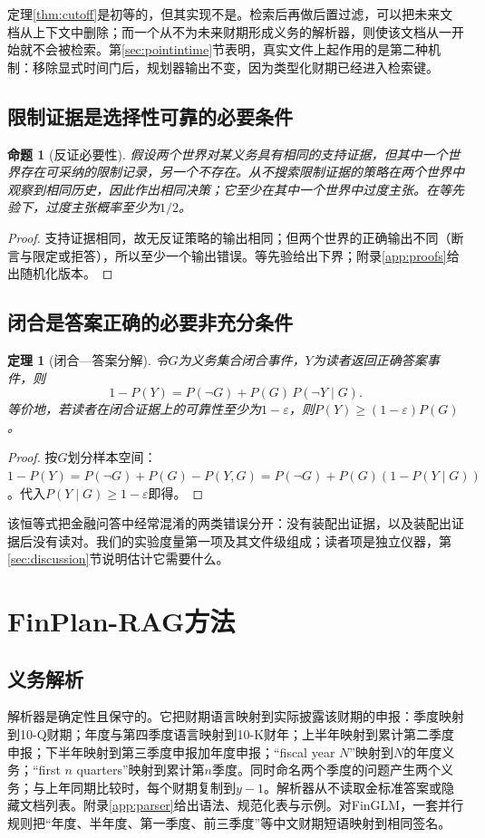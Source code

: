 \documentclass[10.5pt,a4paper]{ctexart}
\newtheorem{theorem}{定理}
\newtheorem{proposition}{命题}
\newcommand{\finplan}{FinPlan\mbox{-}RAG}
\begin{document}
定理\ref{thm:cutoff}是初等的，但其实现不是。检索后再做后置过滤，可以把未来文档从上下文中删除；而一个从不为未来财期形成义务的解析器，则使该文档从一开始就不会被检索。第\ref{sec:pointintime}节表明，真实文件上起作用的是第二种机制：移除显式时间门后，规划器输出不变，因为类型化财期已经进入检索键。

\subsection{限制证据是选择性可靠的必要条件}
\begin{proposition}[反证必要性]
\label{prop:counter}
假设两个世界对某义务具有相同的支持证据，但其中一个世界存在可采纳的限制记录，另一个不存在。从不搜索限制证据的策略在两个世界中观察到相同历史，因此作出相同决策；它至少在其中一个世界中过度主张。在等先验下，过度主张概率至少为$1/2$。
\end{proposition}
\begin{proof}
支持证据相同，故无反证策略的输出相同；但两个世界的正确输出不同（断言与限定或拒答），所以至少一个输出错误。等先验给出下界；附录\ref{app:proofs}给出随机化版本。
\end{proof}

\subsection{闭合是答案正确的必要非充分条件}
\begin{theorem}[闭合—答案分解]
\label{thm:decomp}
令$G$为义务集合闭合事件，$Y$为读者返回正确答案事件，则
\begin{equation}
1-P(Y)=P(\neg G)+P(G)\,P(\neg Y\mid G).
\label{eq:decomp}
\end{equation}
等价地，若读者在闭合证据上的可靠性至少为$1-\varepsilon$，则$P(Y)\ge(1-\varepsilon)P(G)$。
\end{theorem}
\begin{proof}
按$G$划分样本空间：$1-P(Y)=P(\neg G)+P(G)-P(Y,G)=P(\neg G)+P(G)(1-P(Y\mid G))$。代入$P(Y\mid G)\ge1-\varepsilon$即得。
\end{proof}

该恒等式把金融问答中经常混淆的两类错误分开：没有装配出证据，以及装配出证据后没有读对。我们的实验度量第一项及其文件级组成；读者项是独立仪器，第\ref{sec:discussion}节说明估计它需要什么。

\section{\finplan{}方法}
\label{sec:method}
\subsection{义务解析}
解析器是确定性且保守的。它把财期语言映射到实际披露该财期的申报：季度映射到10-Q财期；年度与第四季度语言映射到10-K财年；上半年映射到累计第二季度申报；下半年映射到第三季度申报加年度申报；“fiscal year $N$”映射到$N$的年度义务；“first $n$ quarters”映射到累计第$n$季度。同时命名两个季度的问题产生两个义务；与上年同期比较时，每个财期复制到$y-1$。解析器从不读取金标准答案或隐藏文档列表。附录\ref{app:parser}给出语法、规范化表与示例。对FinGLM，一套并行规则把“年度、半年度、第一季度、前三季度”等中文财期短语映射到相同签名。
\end{document}
